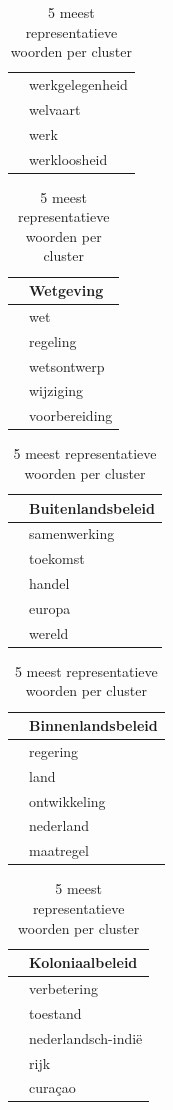 \begin{table}[H]
\begin{tabular}{ll}
 &  werkgelegenheid \\
 &         welvaart \\
 &             werk \\
 &     werkloosheid \\
\bottomrule
\end{tabular}
\begin{tabular}{ll}
\toprule
{} &              \textbf{Wetgeving} \\
\midrule
 &            wet \\
 &       regeling \\
 &    wetsontwerp \\
 &      wijziging \\
 &  voorbereiding \\
\bottomrule
\end{tabular}
\begin{tabular}{ll}
\toprule
{} &             \textbf{Buitenlandsbeleid} \\
\midrule
 &  samenwerking \\
 &      toekomst \\
 &        handel \\
 &        europa \\
 &        wereld \\
\bottomrule
\end{tabular}
\begin{tabular}{ll}
\toprule
{} &             \textbf{Binnenlandsbeleid} \\
\midrule
 &      regering \\
 &          land \\
 &  ontwikkeling \\
 &     nederland \\
 &     maatregel \\
\bottomrule
\end{tabular}
\begin{tabular}{ll}
\toprule
{} &                  \textbf{Koloniaalbeleid} \\
\midrule
  &        verbetering \\
  &           toestand \\
  &             nederlandsch-indië \\
  &               rijk \\
  &              curaçao \\
\bottomrule
\end{tabular}
\caption{5 meest representatieve woorden per cluster}
\label{clusters}
\end{table}

